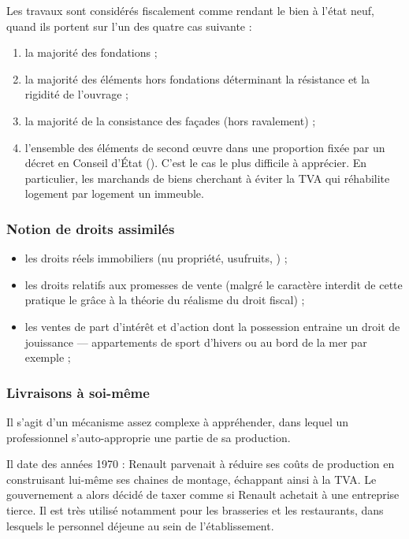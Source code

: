 			Les travaux sont considérés fiscalement comme rendant le bien à l'état neuf, quand ils portent sur l'un des quatre cas suivante :
			\begin{enumerate}
				\item la majorité des fondations ;
				\item la majorité des éléments hors fondations déterminant la résistance et la rigidité de l'ouvrage ;
				\item la majorité de la consistance des façades (hors ravalement) ;
				\item l'ensemble des éléments de second œuvre dans une proportion fixée par un décret en Conseil d'État (). C'est le cas le plus difficile à apprécier. En particulier, les marchands de biens cherchant à éviter la TVA qui réhabilite logement par logement un immeuble.
			\end{enumerate}

		\subsubsection{Notion de droits assimilés}

			\begin{itemize}
				\item les droits réels immobiliers (nu propriété, usufruits, \etc) ;
				\item les droits relatifs aux promesses de vente (malgré le caractère interdit de cette pratique le grâce à la théorie du réalisme du droit fiscal) ;
				\item les ventes de part d'intérêt et d'action dont la possession entraine un droit de jouissance --- appartements de sport d'hivers ou au bord de la mer par exemple ;
			\end{itemize}

		\subsubsection{Livraisons à soi-même}

			Il s'agit d'un mécanisme assez complexe à appréhender, dans lequel un professionnel s'auto-approprie une partie de sa production.

			Il date des années 1970 : Renault parvenait à réduire ses coûts de production en construisant lui-même ses chaines de montage, échappant ainsi à la TVA. Le gouvernement a alors décidé de taxer comme si Renault achetait à une entreprise tierce. Il est très utilisé notamment pour les brasseries et les restaurants, dans lesquels le personnel déjeune au sein de l'établissement.

